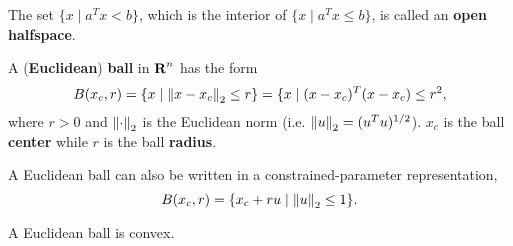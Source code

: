 \begin{Definition}
  The set $\{x \mid a^Tx<b \}$, which is the interior of $\{x \mid a^Tx\le b
  \}$, is called an \textbf{open halfspace}.
\end{Definition}


\begin{Definition}
  A (\textbf{Euclidean}) \textbf{ball} in $\textbf{R}^n$ has the form
  \begin{equation*}
    B(x_c, r) = \{ x \mid \left\|x-x_c\right\|_{2}\le r\} = \{x \mid (x-x_c)^T(x-x_c)\le r^2,
  \end{equation*}
  where $r> 0$ and $\left\|\cdot\right\|_{2}$ is the Euclidean norm
  (i.e. $\left\|u\right\|_{2}=(u^Tu)^{1/2}$). $x_c$ is the ball \textbf{center} while
  $r$ is the ball \textbf{radius}.
\end{Definition}

\begin{Fact}
  A Euclidean ball can also be written in a constrained-parameter representation,
  \begin{equation*}
    B(x_c, r) = \{x_c+ru \mid \left\|u\right\|_{2}\le 1 \}.
  \end{equation*}
\end{Fact}

\begin{Fact}
  A Euclidean ball is convex.
\end{Fact}


